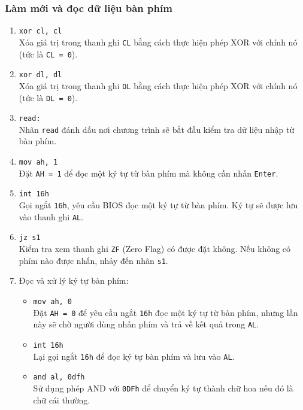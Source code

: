 \documentclass[12pt]{article}
\begin{document}
\subsubsection*{Làm mới và đọc dữ liệu bàn phím}
\begin{enumerate}[label=\textbf{\arabic*.}]
    \item \texttt{xor cl, cl} \\
    Xóa giá trị trong thanh ghi \texttt{CL} bằng cách thực hiện phép XOR với chính nó (tức là \texttt{CL = 0}).
    
    \item \texttt{xor dl, dl} \\
    Xóa giá trị trong thanh ghi \texttt{DL} bằng cách thực hiện phép XOR với chính nó (tức là \texttt{DL = 0}).
    
    \item \texttt{read:} \\
    Nhãn \texttt{read} đánh dấu nơi chương trình sẽ bắt đầu kiểm tra dữ liệu nhập từ bàn phím.
    
    \item \texttt{mov ah, 1} \\
    Đặt \texttt{AH = 1} để đọc một ký tự từ bàn phím mà không cần nhấn \texttt{Enter}.
    
    \item \texttt{int 16h} \\
    Gọi ngắt \texttt{16h}, yêu cầu BIOS đọc một ký tự từ bàn phím. Ký tự sẽ được lưu vào thanh ghi \texttt{AL}.
    
    \item \texttt{jz s1} \\
    Kiểm tra xem thanh ghi \texttt{ZF} (Zero Flag) có được đặt không. Nếu không có phím nào được nhấn, nhảy đến nhãn \texttt{s1}.
    
    \item Đọc và xử lý ký tự bàn phím:
    \begin{itemize}
        \item \texttt{mov ah, 0} \\
        Đặt \texttt{AH = 0} để yêu cầu ngắt \texttt{16h} đọc một ký tự từ bàn phím, nhưng lần này sẽ chờ người dùng nhấn phím và trả về kết quả trong \texttt{AL}.
        
        \item \texttt{int 16h} \\
        Lại gọi ngắt \texttt{16h} để đọc ký tự bàn phím và lưu vào \texttt{AL}.
        
        \item \texttt{and al, 0dfh} \\
        Sử dụng phép AND với \texttt{0DFh} để chuyển ký tự thành chữ hoa nếu đó là chữ cái thường.
        

\end{itemize}
\end{enumerate}
\end{document}
